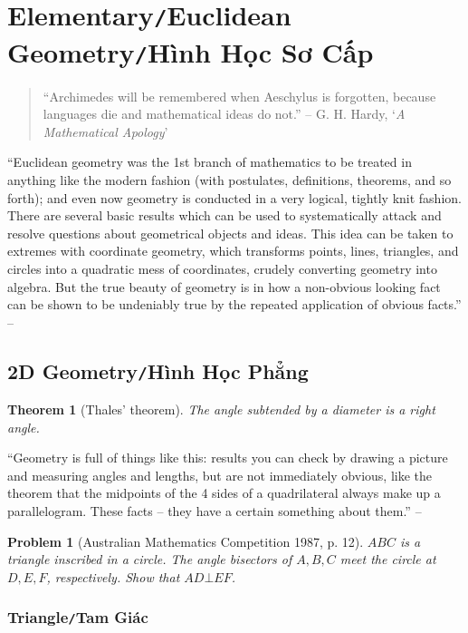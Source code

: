\documentclass{article}
\numberwithin{equation}{section}
\newtheorem{theorem}{Theorem}[section]
\newtheorem{problem}{Problem}[section]
\begin{document}
\section{Elementary\texttt{/}Euclidean Geometry\texttt{/}Hình Học Sơ Cấp}
\begin{quotation}
	``Archimedes will be remembered when Aeschylus is forgotten, because languages die and mathematical ideas do not.'' -- G. H. Hardy, `\textit{A Mathematical Apology}'
\end{quotation}
``Euclidean geometry was the 1st branch of mathematics to be treated in anything like the modern fashion (with postulates, definitions, theorems, and so forth); and even now geometry is conducted in a very logical, tightly knit fashion. There are several basic results which can be used to systematically attack and resolve questions about geometrical objects and ideas. This idea can be taken to extremes with coordinate geometry, which transforms points, lines, triangles, and circles into a quadratic mess of coordinates, crudely converting geometry into algebra. But the true beauty of geometry is in how a non-obvious looking fact can be shown to be undeniably true by the repeated application of obvious facts.'' -- \cite[Chap. 4, p. 49]{Tao2006}

\subsection{2D Geometry\texttt{/}Hình Học Phẳng}
\begin{theorem}[Thales' theorem]
	The angle subtended by a diameter is a right angle.
\end{theorem}
``Geometry is full of things like this: results you can check by drawing a picture and measuring angles and lengths, but are not immediately obvious, like the theorem that the midpoints of the 4 sides of a quadrilateral always make up a parallelogram. These facts -- they have a certain something about them.'' -- \cite[Chap. 4, p. 50]{Tao2006}

\begin{problem}[Australian Mathematics Competition 1987, p. 12]
	$ABC$ is a triangle inscribed in a circle. The angle bisectors of $A,B,C$ meet the circle at $D,E,F$, respectively. Show that $AD\bot EF$.
\end{problem}

\subsubsection{Triangle\texttt{/}Tam Giác}
\end{document}
